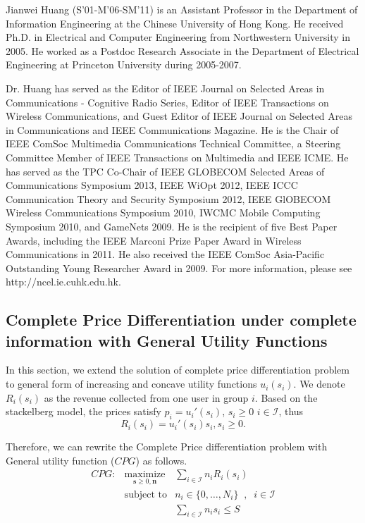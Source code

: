 \documentclass[twocolumn,10pt,twosided]{IEEEtran}
\begin{document}
\begin{IEEEbiography}[{\texttt{[image: \{jianweihuang]}}}]{Jianwei Huang (S'01-M'06-SM'11)}
is an Assistant Professor in the Department of Information Engineering at the Chinese University of Hong Kong. He received Ph.D. in Electrical and Computer Engineering from Northwestern University in 2005. He worked as a Postdoc Research Associate in the Department of Electrical Engineering at Princeton University during 2005-2007. 

Dr. Huang has served as the Editor of IEEE Journal on Selected Areas in Communications - Cognitive Radio Series, Editor of IEEE Transactions on Wireless Communications, and Guest Editor of IEEE Journal on Selected Areas in Communications and IEEE Communications Magazine. He is the Chair of IEEE ComSoc Multimedia Communications Technical Committee, a Steering Committee Member of IEEE Transactions on Multimedia and IEEE ICME. He has served as the TPC Co-Chair of IEEE GLOBECOM Selected Areas of Communications Symposium 2013, IEEE WiOpt 2012, IEEE ICCC Communication Theory and Security Symposium 2012, IEEE GlOBECOM Wireless Communications Symposium 2010, IWCMC Mobile Computing Symposium 2010, and GameNets 2009. He is the recipient of five Best Paper Awards, including the IEEE Marconi Prize Paper Award in Wireless Communications in 2011. He also received the IEEE ComSoc Asia-Pacific Outstanding Young Researcher Award in 2009. For more information, please see http://ncel.ie.cuhk.edu.hk. 
\end{IEEEbiography}



\appendix

\subsection{Complete Price Differentiation under complete information with General Utility Functions}
\label{sec:general_utility}
In this section, we extend the solution of complete price differentiation problem to general form of increasing and concave utility functions $u_i(s_i)$. We denote $R_i(s_i)$ as the revenue collected from one user in group $i$. Based on the stackelberg model, the prices satisfy $p_i=u_i'(s_i)$,
$s_i\ge 0$ $i\in\mathcal{I}$, thus
\begin{equation}
\label{eq:revenue}
    R_i(s_i)=u_i'(s_i)s_i, s_i\ge 0.
\end{equation}


Therefore, we can rewrite the Complete Price differentiation problem with General utility function ($CPG$) as follows.
\begin{eqnarray}
    CPG:& \underset{\boldsymbol{s}\geq 0,\boldsymbol{n}}{\text{maximize}}& \sum\limits_{i\in\mathcal{I}} n_i R_i(s_i) \nonumber\\
    &\text{subject to}&  n_i \in\{0,\ldots,N_{i}\} \;\;,\;\;  i\in\mathcal{I}\\
    &&\sum\limits_{i\in\mathcal{I}} n_i s_{i} \le S \label{eq:resource_con}
\end{eqnarray}
\end{document}
